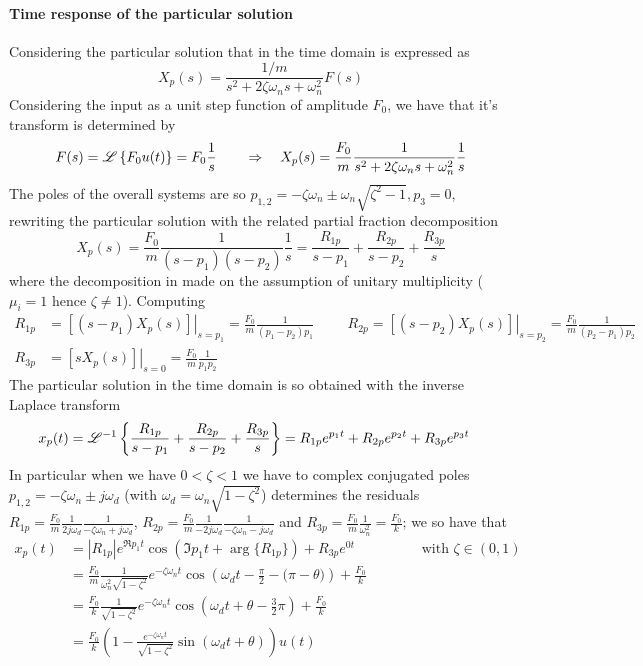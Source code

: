 			
		\paragraph{Time response of the particular solution} Considering the particular solution that in the time domain is expressed as
		\[ X_p(s) = \frac{1/m}{s^2 + 2 \zeta \omega_n s + \omega_n^2} F(s) \]
		Considering the  input as a unit step function of amplitude $F_0$, we have that it's transform is determined by
		\[ F(s) = \mathscr L \left\{  F_0 u(t) \right\} = F_0 \frac 1 s \qquad \Rightarrow \quad X_p(s) = \frac{F_0}{m} \frac{1}{s^2 + 2\zeta\omega_ns + \omega_n^2} \frac 1 s \]
		The poles of the overall systems are so $p_{1,2} = -\zeta \omega_n \pm \omega_n \sqrt{\zeta^2 - 1}, p_3 = 0$, rewriting the particular solution with the related partial fraction decomposition
		\[ X_p(s) = \frac{F_0}m \frac{1}{(s-p_1)(s-p_2)} \frac 1 s = \frac{R_{1p}}{s-p_1} + \frac{R_{2p}}{s-p_2} + \frac{R_{3p}}{s} \]
		where the decomposition in made on the assumption of unitary multiplicity ($\mu_i = 1$ hence $\zeta \neq 1$). Computing
		\begin{align*}
			R_{1p} & = \left.\left[ (s-p_1) X_p(s)\right] \right|_{s=p_1} = \frac{F_0}{m} \frac{1}{(p_1-p_2)p_1} \hspace{1cm}
			R_{2p} = \left.\left[ (s-p_2) X_p(s)\right] \right|_{s=p_2} = \frac{F_0}{m} \frac{1}{(p_2-p_1)p_2} \\
			R_{3p} & = \left.\left[ s X_p(s)\right] \right|_{s=0} = \frac{F_0}{m} \frac{1}{p_1p_2} 
		\end{align*}
		The particular solution in the time domain is so obtained with the inverse Laplace transform
		\begin{align*}
			x_p(t) & = \mathscr L^{-1} \left\{  \frac{R_{1p}}{s - p_1} + \frac{R_{2p}}{s-p_2} + \frac{R_{3p}}{s}  \right\}  = R_{1p}e^{p_1t} + R_{2p}e^{p_2t} + R_{3p}e^{p_3t}
		\end{align*}
		In particular when we have $0 < \zeta < 1$ we have to complex conjugated poles $p_{1,2} = - \zeta \omega_n \pm j \omega_d$ (with $\omega_d = \omega_n \sqrt{1-\zeta^2}$) determines the residuals $R_{1p} = \frac{F_0}m \frac {1}{2j\omega_d} \frac{1}{-\zeta \omega_n + j\omega_d}$, $R_{2p} = \frac{F_0}m \frac {1}{-2j\omega_d} \frac{1}{-\zeta \omega_n - j\omega_d}$ and $R_{3p} = \frac{F_0}{m } \frac{1}{\omega_n^2} = \frac{F_0}{k}$; we so have that
		\begin{align*}
			x_p(t) &  = |R_{1p}| e^{ \Re{p_1} t } \cos\left( \Im{p_1} t + \arg\{R_{1p}\} \right) + R_{3p} e^{0t} \hspace{2cm} \textrm{with } \zeta \in (0,1 )\\ & 
			= \frac{F_0}{m} \frac{1}{\omega_n^2\sqrt{1-\zeta^2}} e^{ -\zeta \omega_n t } \cos\left( \omega_d t - \frac \pi 2  - \big(\pi-\theta\big) \right) + \frac{F_0}{k} \\
			& = \frac{F_0}{k} \frac{1}{\sqrt{1-\zeta^2}} e^{ -\zeta \omega_n t } \cos\left( \omega_d t +\theta - \frac 3 2 \pi \right) + \frac{F_0}{k} \\ 
			& = \frac{F_0}{k} \left( 1 - \frac{e^{-\zeta \omega_n t}}{\sqrt{1-\zeta^2}} \sin\left( \omega_d t + \theta \right) \right) u(t) \\ 
		\end{align*}
		
